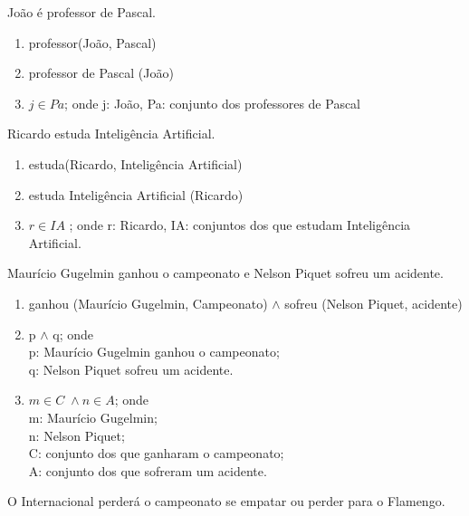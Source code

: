 \bigskip
\begin{exemplo} João é professor de Pascal.
\end{exemplo}

\begin{enumerate}[label=(\roman*)]
    \item professor(João, Pascal)
    \item professor de Pascal (João)
    \item $j \in Pa$; onde j: João, Pa: conjunto dos professores de Pascal
\end{enumerate}

\bigskip
\begin{exemplo} Ricardo estuda Inteligência Artificial.
 \end{exemplo}

\begin{enumerate}[label=(\roman*)]
    \item estuda(Ricardo, Inteligência Artificial)
    \item estuda Inteligência Artificial (Ricardo)
    \item $r \in IA$ ; onde r: Ricardo, IA: conjuntos dos que estudam Inteligência Artificial.
\end{enumerate}

\bigskip
\begin{exemplo} Maurício Gugelmin ganhou o campeonato e Nelson Piquet sofreu um acidente.
\end{exemplo}

\begin{enumerate}[label=(\roman*)]
    \item ganhou (Maurício Gugelmin, Campeonato) $\land$ sofreu (Nelson Piquet, acidente)
    \item p $\land$ q; onde\\
    p: Maurício Gugelmin ganhou o campeonato;\\
    q: Nelson Piquet sofreu um acidente.
    \item $m \in C \; \land n \in A$; onde\\
    m: Maurício Gugelmin;\\
    n: Nelson Piquet;\\
    C: conjunto dos que ganharam o campeonato;\\
    A: conjunto dos que sofreram um acidente.
\end{enumerate}

\bigskip
\begin{exemplo} O Internacional perderá o campeonato se empatar ou perder para o Flamengo.
\end{exemplo}

